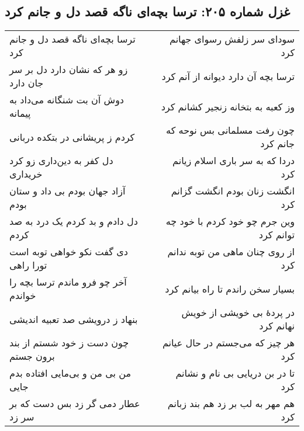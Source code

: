 \begin{center}
\section*{غزل شماره ۲۰۵: ترسا بچه‌ای ناگه قصد دل و جانم کرد}
\label{sec:205}
\begin{longtable}{l p{0.5cm} r}
ترسا بچه‌ای ناگه قصد دل و جانم کرد
&&
سودای سر زلفش رسوای جهانم کرد
\\
زو هر که نشان دارد دل بر سر جان دارد
&&
ترسا بچه آن دارد دیوانه از آنم کرد
\\
دوش آن بت شنگانه می‌داد به پیمانه
&&
وز کعبه به بتخانه زنجیر کشانم کرد
\\
کردم ز پریشانی در بتکده دربانی
&&
چون رفت مسلمانی بس نوحه که جانم کرد
\\
دل کفر به دین‌داری زو کرد خریداری
&&
دردا که به سر باری اسلام زیانم کرد
\\
آزاد جهان بودم بی داد و ستان بودم
&&
انگشت زنان بودم انگشت گزانم کرد
\\
دل دادم و بد کردم یک درد به صد کردم
&&
وین جرم چو خود کردم با خود چه توانم کرد
\\
دی گفت نکو خواهی توبه است تورا راهی
&&
از روی چنان ماهی من توبه ندانم کرد
\\
آخر چو فرو ماندم ترسا بچه را خواندم
&&
بسیار سخن راندم تا راه بیانم کرد
\\
بنهاد ز درویشی صد تعبیه اندیشی
&&
در پردهٔ بی خویشی از خویش نهانم کرد
\\
چون دست ز خود شستم از بند برون جستم
&&
هر چیز که می‌جستم در حال عیانم کرد
\\
من بی من و بی‌مایی افتاده بدم جایی
&&
تا در بن دریایی بی نام و نشانم کرد
\\
عطار دمی گر زد بس دست که بر سر زد
&&
هم مهر به لب بر زد هم بند زبانم کرد
\\
\end{longtable}
\end{center}
